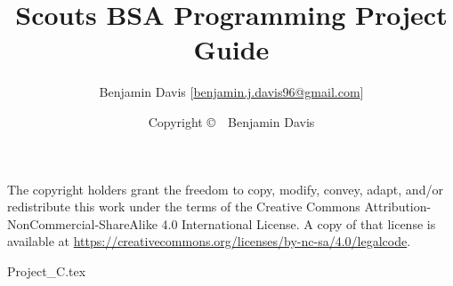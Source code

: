 \documentclass[letterpaper,12pt]{book}
\title{Scouts BSA Programming Project Guide}
\author{
  Benjamin Davis [\href{mailto:benjamin.j.davis96@gmail.com}{benjamin.j.davis96@gmail.com}]
}
\date{Copyright \copyright\ \the\year\ Benjamin Davis}
\begin{document}
  \pagestyle{simple}
  \maketitle
  
  \begin{center}
    \vspace*{\fill}
    The copyright holders grant the freedom to copy, modify, convey, adapt, and/or redistribute this work
    under the terms of the Creative Commons Attribution-NonCommercial-ShareAlike 4.0
    International License. A copy of that license is available at
    \url{https://creativecommons.org/licenses/by-nc-sa/4.0/legalcode}.
    \vspace*{\fill}
  \end{center}

  \frontmatter
  \pagestyle{plain}

  \tableofcontents

  \mainmatter

  

  

  

  

  {Project_C.tex}

\appendix





\end{document}
